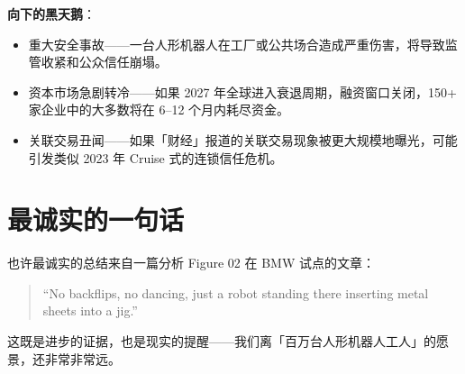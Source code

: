 \textbf{向下的黑天鹅}：
\begin{itemize}
  \item 重大安全事故——一台人形机器人在工厂或公共场合造成严重伤害，将导致监管收紧和公众信任崩塌。
  \item 资本市场急剧转冷——如果 2027 年全球进入衰退周期，融资窗口关闭，150+ 家企业中的大多数将在 6--12 个月内耗尽资金。
  \item 关联交易丑闻——如果「财经」报道的关联交易现象被更大规模地曝光，可能引发类似 2023 年 Cruise 式的连锁信任危机。
\end{itemize}

\section{最诚实的一句话}

\begin{corebox}[Reality]
也许最诚实的总结来自一篇分析 Figure 02 在 BMW 试点的文章\cite{figure2026bmw}：

\begin{quote}
``No backflips, no dancing, just a robot standing there inserting metal sheets into a jig.''
\end{quote}

这既是进步的证据，也是现实的提醒——我们离「百万台人形机器人工人」的愿景，还非常非常远。
\end{corebox}
